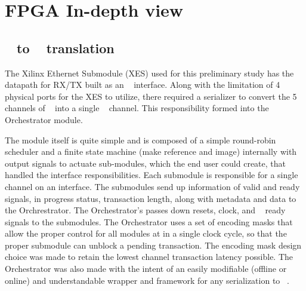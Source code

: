 



\section{FPGA In-depth view}

\subsection{\axifull~ to \axistream~ translation}
The Xilinx Ethernet Submodule (XES) used for this preliminary study has the datapath for RX/TX built as an \axistream~ interface. Along with the limitation of 4 physical ports for the XES to utilize, there required a serializer to  convert the 5 channels of \axifull~ into a single \axistream~ channel. This responsibility formed into the Orchestrator module.

The module itself is quite simple and is composed of a simple round-robin scheduler and a finite state machine (make reference and image) internally with output signals to actuate sub-modules, which the end user could create, that handled the interface responsibilities.  Each submodule is responsible for a single channel on an interface. The submodules send up information of valid and ready signals, in progress status, transaction length, along with metadata and data to the Orchrestrator. The Orchestrator's passes down resets, clock, and \axistream~ ready signals to the submodules. The Orchestrator uses a set of encoding masks that allow the proper control for all modules at in a single clock cycle, so that the proper submodule can unblock a pending transaction. The encoding mask design choice was made to retain the lowest channel transaction latency possible. The Orchestrator was also made with the intent of an easily modifiable (offline or online) and understandable wrapper and framework for any serialization to \axistream~. 

